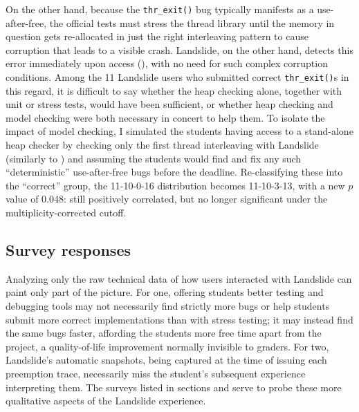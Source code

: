On the other hand, because the {\tt thr\_exit()} bug typically manifests as a use-after-free,
the official tests must stress the thread library until the memory in question gets re-allocated
in just the right interleaving pattern to cause corruption that leads to a visible crash.
Landslide, on the other hand, detects this error immediately upon access (\sect{\ref{sec:landslide-valgrind-mode}}),
with no need for such complex corruption conditions.
Among the 11 Landslide users who submitted correct {\tt thr\_exit()}s in this regard,
it is difficult to say whether the heap checking alone, together with unit or stress tests,
would have been sufficient,
or whether heap checking and model checking were both necessary in concert to help them.
To isolate the impact of model checking,
I simulated the students having access to a stand-alone heap checker
by checking only the first thread interleaving with Landslide
(similarly to \sect{\ref{sec:quicksand-eval}})
and assuming the students would find and fix any such ``deterministic'' use-after-free bugs before the deadline.
Re-classifying these into the ``correct'' group,
the 11-10-0-16 distribution becomes
11-10-3-13,
with a new $p$ value of 0.048:
still positively correlated, but no longer significant under the multiplicity-corrected cutoff.

\subsection{Survey responses}
\label{sec:education-eval-survey}

Analyzing only the raw technical data of how users interacted with Landslide can paint only part of the picture.
For one, offering students better testing and debugging tools
may not necessarily find strictly more bugs or help students submit more correct implementations
than with stress testing;
it may instead find the same bugs faster,
affording the students more free time apart from the project,
a quality-of-life improvement normally invisible to graders.
For two, Landslide's automatic snapshots, being captured at the time of issuing each preemption trace,
necessarily miss the student's subsequent experience interpreting them.
The surveys listed in sections \sect{\ref{sec:education-survey-pebbles}} and \sect{\ref{sec:education-survey-pintos}}
serve to probe these more qualitative aspects of the Landslide experience.

